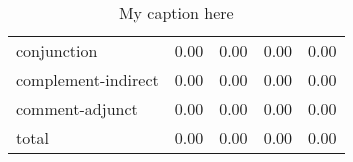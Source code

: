 \begin{table}[!ht]
\begin{tabular}{lrrrr}
conjunction               &     0.00 &                        0.00 &                    0.00 &                    0.00 \\
complement-indirect       &     0.00 &                        0.00 &                    0.00 &                    0.00 \\
comment-adjunct           &     0.00 &                        0.00 &                    0.00 &                    0.00 \\
total                     &     0.00 &                        0.00 &                    0.00 &                    0.00 \\
\bottomrule
\end{tabular}
\caption{My caption here}
\label{tab:constituency-general-relative}
\end{table}